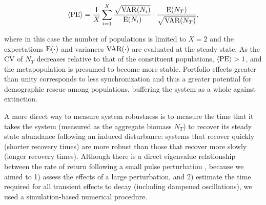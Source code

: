 \documentclass[twocolumn,preprintnumbers,amsmath,amssymb,superscriptaddress]{revtex4}
\begin{document}
\begin{equation}
\langle{\rm PE}\rangle =\frac{1}{X}\sum_{i=1}^{X} \frac{\sqrt{{\rm VAR}(N_i)}}{{\rm E}(N_i)}\cdot \frac{{\rm E}(N_T)}{\sqrt{{\rm VAR}(N_T)}},
\label{eq:pe}
\end{equation}

\noindent where in this case the number of populations is limited to $X=2$ and the expectations $\rm E(\cdot)$ and variances $\rm VAR(\cdot)$ are evaluated at the steady state.
As the CV of $N_T$ decreases relative to that of the constituent populations, $\langle{\rm PE}\rangle > 1$, and the metapopulation is presumed to become more stable.
Portfolio effects greater than unity corresponds to less synchronization  \cite{Loreau:2008ju,Anderson:2014cx,Yeakel:2013vz} and thus a greater potential for demographic rescue among populations, buffering the system as a whole against extinction. 

A more direct way to measure system robustness is to measure the time that it takes the system (measured as the aggregate biomass $N_T$) to recover its steady state abundance following an induced disturbance: systems that recover quickly (shorter recovery times) are more robust than those that recover more slowly (longer recovery times).
Although there is a direct eigenvalue relationship between the rate of return following a small pulse perturbation \cite{GuckHolmes}, because we aimed to 1) assess the effects of a large perturbation, and 2) estimate the time required for all transient effects to decay (including dampened oscillations), we used a simulation-based numerical procedure.
\end{document}
